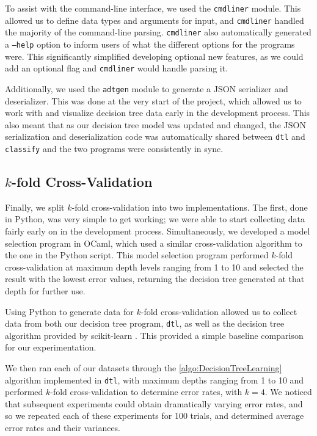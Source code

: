 \documentclass[screen, authorversion, nonacm, sigconf]{acmart}
\begin{document}
To assist with the command-line interface, we used the \texttt{cmdliner} module. This allowed us to define data types and arguments for input, and \texttt{cmdliner} handled the majority of the command-line parsing. \texttt{cmdliner} also automatically generated a \texttt{--help} option to inform users of what the different options for the programs were. This significantly simplified developing optional new features, as we could add an optional flag and \texttt{cmdliner} would handle parsing it.

Additionally, we used the \texttt{adtgen} module to generate a JSON serializer and deserializer. This was done at the very start of the project, which allowed us to work with and visualize decision tree data early in the development process. This also meant that as our decision tree model was updated and changed, the JSON serialization and deserialization code was automatically shared between \texttt{dtl} and \texttt{classify} and the two programs were consistently in sync.

\subsection{$k$-fold Cross-Validation}

Finally, we split $k$-fold cross-validation into two implementations. The first, done in Python, was very simple to get working; we were able to start collecting data fairly early on in the development process. Simultaneously, we developed a model selection program in OCaml, which used a similar cross-validation algorithm to the one in the Python script. This model selection program performed $k$-fold cross-validation at maximum depth levels ranging from 1 to 10 and selected the result with the lowest error values, returning the decision tree generated at that depth for further use.

Using Python to generate data for $k$-fold cross-validation allowed us to collect data from both our decision tree program, \texttt{dtl}, as well as the decision tree algorithm provided by scikit-learn \cite{scikit-learn}. This provided a simple baseline comparison for our experimentation.

We then ran each of our datasets through the \ref{algo:DecisionTreeLearning} algorithm implemented in \texttt{dtl}, with maximum depths ranging from 1 to 10 and performed $k$-fold cross-validation to determine error rates, with $k = 4$. We noticed that subsequent experiments could obtain dramatically varying error rates, and so we repeated each of these experiments for 100 trials, and determined average error rates and their variances.
\end{document}
